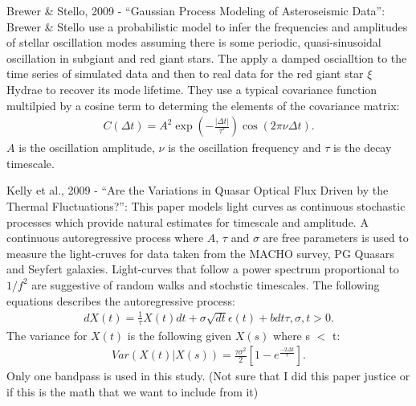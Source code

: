 \documentclass[letterpaper,12pt,preprint]{aastex}
\begin{document}
Brewer \& Stello, 2009 - ``Gaussian Process Modeling of Asteroseismic
Data'': Brewer \& Stello use a probabilistic model to infer the
frequencies and amplitudes of stellar oscillation modes assuming there
is some periodic, quasi-sinusoidal oscillation in subgiant and red
giant stars. The apply a damped oscialltion to the time series of
simulated data and then to real data for the red giant star $\xi$
Hydrae to recover its mode lifetime. They use a typical covariance
function multilpied by a cosine term to determing the elements of the
covariance matrix:
\begin{eqnarray}
C(\Delta t)= A^2 \exp \left( -\frac{|\Delta t|}{\tau'}\right ) \cos (2
\pi \nu \Delta t).
\end{eqnarray}
$A$ is the oscillation amplitude, $\nu$ is the oscillation frequency
and $\tau$ is the decay timescale.

Kelly et al., 2009 - ``Are the Variations in Quasar Optical Flux
Driven by the Thermal Fluctuations?'': This paper models light curves
as continuous stochastic processes which provide natural estimates for
timescale and amplitude. A continuous autoregressive process where
$A$, $\tau$ and $\sigma$ are free parameters is used to measure the
light-cruves for data taken from the MACHO survey, PG Quasars and
Seyfert galaxies. Light-curves that follow a power spectrum
proportional to $1/f^2$ are suggestive of random walks and stochstic
timescales. The following equations describes the autoregressive
process:
\begin{eqnarray}
dX(t)=\frac{1}{\tau}X(t)dt + \sigma\sqrt{dt}\epsilon(t)+bdt
\tau,\sigma,t > 0.
\end{eqnarray}
The variance for $X(t)$ is the following given $X(s)$ where s $<$ t:
\begin{eqnarray}
Var(X(t)|X(s))=\frac{\tau \sigma^2}{2}\left [ 1-e^\frac{-2\Delta
    t}{\tau}\right].
\end{eqnarray}
Only one bandpass is used in this study. (Not sure that I did this
paper justice or if this is the math that we want to include from it)
\end{document}
